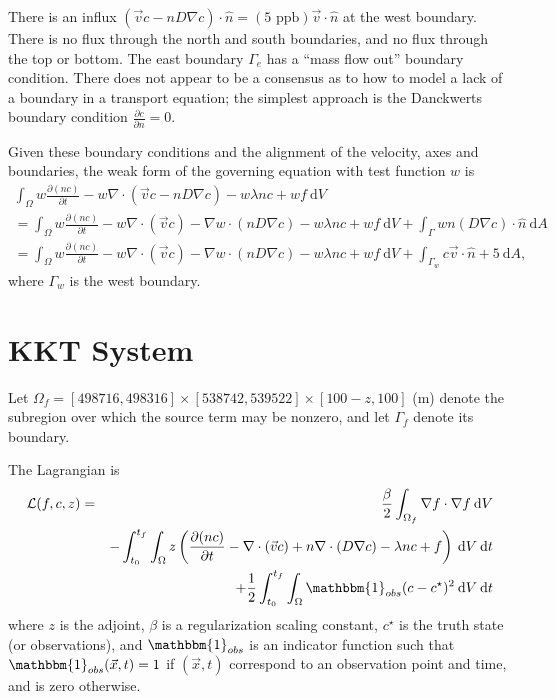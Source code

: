 \documentclass[12pt, letterpaper]{article}
\newcommand{\dA}{{\:\textrm{d}A}}
\newcommand{\dV}{{\:\textrm{d}V}}
\newcommand{\dt}{{\:\textrm{d}t}}
\begin{document}
There is an influx $(\vec{v}c-nD\nabla c)\cdot\hat{n}=(5\textrm{ ppb})\vec{v}\cdot\hat{n}$ at the west boundary. There is no flux through the north and south boundaries, and no flux through the top or bottom. The east boundary $\Gamma_e$ has a ``mass flow out'' boundary condition. There does not appear to be a consensus as to how to model a lack of a boundary in a transport equation; the simplest approach is the Danckwerts boundary condition $\frac{\partial c}{\partial n}=0$. 

Given these boundary conditions and the alignment of the velocity, axes and boundaries, the weak form of the governing equation with test function $w$ is
\begin{multline*}
\int_\Omega w\frac{\partial (nc)}{\partial t} - w\nabla\cdot(\vec{v}c - nD\nabla c) - w\lambda nc + wf \dV \\
= \int_\Omega w\frac{\partial (nc)}{\partial t} - w\nabla\cdot(\vec{v}c) - \nabla w\cdot (nD\nabla c) - w\lambda nc + wf \dV + \int_\Gamma wn(D\nabla c)\cdot\hat{n} \dA\\
= \int_\Omega w\frac{\partial (nc)}{\partial t} - w\nabla\cdot(\vec{v}c) - \nabla w\cdot (nD\nabla c) - w\lambda nc + wf \dV + \int_{\Gamma_w} c\vec{v}\cdot\hat{n}+5 \dA,
\end{multline*}
where $\Gamma_w$ is the west boundary.

\section{KKT System}

Let $\Omega_f=[498716,498316]\times[538742,539522]\times[100-z,100]$ (m) denote the subregion over which the source term may be nonzero, and let $\Gamma_f$ denote its boundary.

The Lagrangian is
\begin{eqnarray*}
\mathcal{L}(f,c,z) &=& \frac{\beta}{2}\int_{\Omega_f}\nabla f\cdot\nabla f\dV \\
&& -\int_{t_0}^{t_f}\int_\Omega z\left(\frac{\partial (nc)}{\partial t}-\nabla\cdot(\vec{v}c)+n\nabla\cdot (D\nabla c)-\lambda n c + f\right)\dV\dt \\
&& +\frac{1}{2}\int_{t_0}^{t_f}\int_\Omega \mathbbm{1}_{obs}(c-c^\star)^2 \dV\dt
\end{eqnarray*}
where $z$ is the adjoint, $\beta$ is a regularization scaling constant, $c^\star$ is the truth state (or observations), and $\mathbbm{1}_{obs}$ is an indicator function such that $\mathbbm{1}_{obs}(\vec{x},t)=1$ if $(\vec{x},t)$ correspond to an observation point and time, and is zero otherwise.
\end{document}
